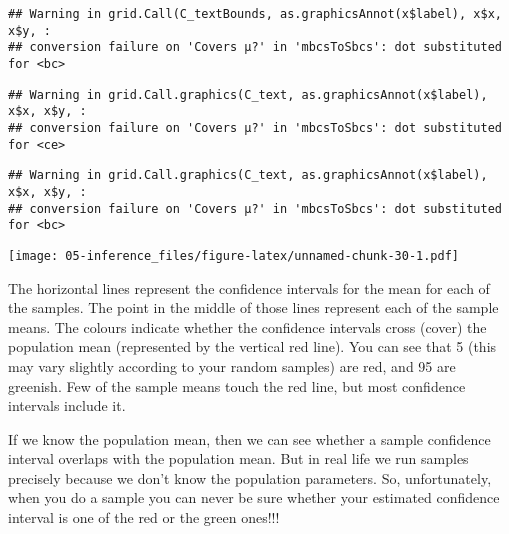 \documentclass[
]{book}
\begin{document}
\begin{verbatim}
## Warning in grid.Call(C_textBounds, as.graphicsAnnot(x$label), x$x, x$y, :
## conversion failure on 'Covers μ?' in 'mbcsToSbcs': dot substituted for <bc>
\end{verbatim}

\begin{verbatim}
## Warning in grid.Call.graphics(C_text, as.graphicsAnnot(x$label), x$x, x$y, :
## conversion failure on 'Covers μ?' in 'mbcsToSbcs': dot substituted for <ce>
\end{verbatim}

\begin{verbatim}
## Warning in grid.Call.graphics(C_text, as.graphicsAnnot(x$label), x$x, x$y, :
## conversion failure on 'Covers μ?' in 'mbcsToSbcs': dot substituted for <bc>
\end{verbatim}

\texttt{[image: 05-inference\_files/figure-latex/unnamed-chunk-30-1.pdf]}

The horizontal lines represent the confidence intervals for the mean for each of the samples. The point in the middle of those lines represent each of the sample means. The colours indicate whether the confidence intervals cross (cover) the population mean (represented by the vertical red line). You can see that 5 (this may vary slightly according to your random samples) are red, and 95 are greenish. Few of the sample means touch the red line, but most confidence intervals include it.

If we know the population mean, then we can see whether a sample confidence interval overlaps with the population mean. But in real life we run samples precisely because we don't know the population parameters. So, unfortunately, when you do a sample you can never be sure whether your estimated confidence interval is one of the red or the green ones!!!
\end{document}
